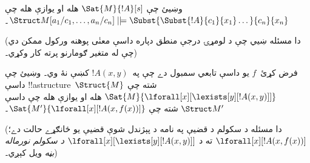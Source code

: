 \documentclass[../../../include/open-logic-section]{subfiles}
\begin{document}
\begin{prob}
وښيئ چې $\Sat{M}{!A}[s]$ هله او يوازې هله چې
$\Struct M[a_1/c_1,\dots,a_n/c_n]
\VDash \Subst{\Subst{!A}{c_1}{x_1}\dots}{c_n}{x_n}$۔

(دا مسئله ښيي چې د لومړۍ درجې منطق دپاره داسې معنٰی پوهنه ورکول
ممکن دي چې له متغير ګومارنو پرته کار وکړي۔)
\end{prob}

\begin{prob}
فرض کړئ~$f$ يو داسې تابعي سمبول دے چې په~$!A(x,y)$ کښې نۀ وي۔ وښيئ
چې داسې !!a{structure}~$\Struct{M}$ شته چې
$\Sat{M}{\lforall[x][\lexists[y][!A(x,y)]]}$ هله او يوازې هله چې داسې
$\Struct M'$ شته چې $\Sat{M'}{\lforall[x][!A(x,f(x))]}$۔

(دا مسئله د سکولم د قضيې په نامه د پېژندل شوې قضيې يو ځانګړے حالت
دے؛ $\lforall[x][!A(x,f(x))]$ ته د
$\lforall[x][\lexists[y][!A(x,y)]]$ \emph{د سکولم نورماله بڼه} ويل
کېږي۔)
\end{prob}
\end{document}

